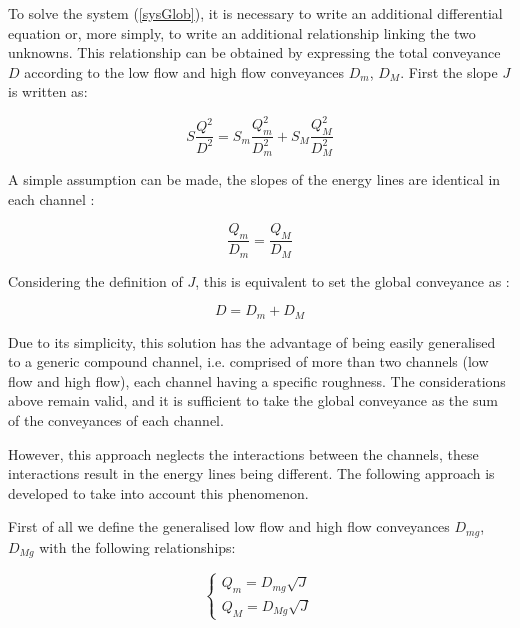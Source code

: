 To solve the system (\ref{sysGlob}), it is necessary to write an additional differential equation or, more simply, to write an additional relationship linking the two unknowns. This relationship can be obtained by expressing the total conveyance $D$ according to the low flow and high flow conveyances $D_m$, $D_M$. First the slope $J$ is written as:

\begin{equation}
  S \frac{Q^2}{D^2} = S_m \frac{Q_{m}^2}{D_{m}^2} + S_M \frac{Q_{M}^2}{D_{M}^2}
\end{equation}

\vspace{0.5cm}

A simple assumption can be made, the slopes of the energy lines are identical in each channel :

\begin{equation}
  \frac{Q_m}{D_m} = \frac{Q_M}{D_M}
\end{equation}

\vspace{0.5cm}

Considering the definition of $J$, this is equivalent to set the global \linebreak conveyance as :

\begin{equation}
  D = D_m + D_M
\end{equation}

\vspace{0.5cm}

Due to its simplicity, this solution has the advantage of being easily generalised to a generic compound channel, i.e. comprised of more than two channels (low flow and high flow), each channel having a specific roughness. The considerations above remain valid, and it is sufficient to take the global conveyance as the sum of the conveyances of each channel.

\vspace{0.5cm}

However, this approach neglects the interactions between the channels, these interactions result in the energy lines being different. The following approach is developed to take into account this phenomenon.

\vspace{0.5cm}

First of all we define the generalised low flow and high flow conveyances $D_{mg}$, $D_{Mg}$ with the following relationships:

\begin{equation}
 \left \lbrace
  \begin{array}{l}
    Q_m =  D_{mg} \sqrt{J}\\
    Q_M =  D_{Mg} \sqrt{J}
  \end{array}
 \right.
\end{equation}

